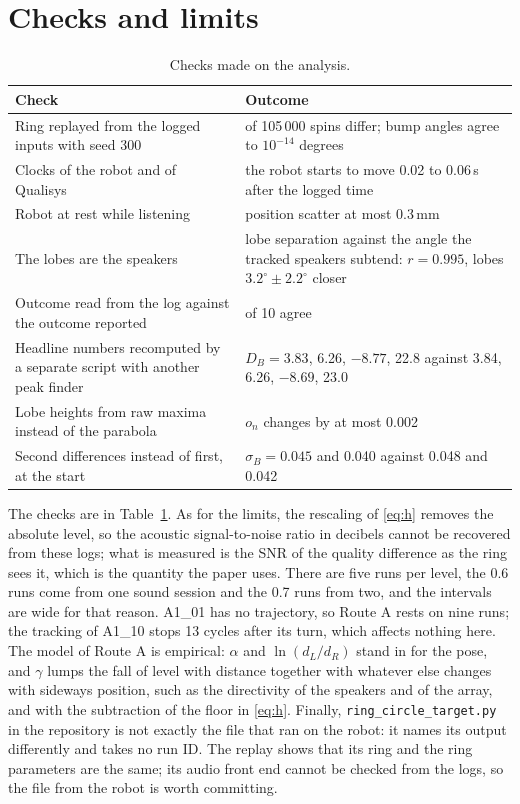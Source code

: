 \documentclass[11pt,a4paper]{article}
\newcommand{\code}[1]{\texttt{#1}}
\begin{document}
\section{Checks and limits}

\begin{table}[H]
\centering\small
\caption{Checks made on the analysis.}
\label{tab:checks}
\begin{tabular}{@{}>{\raggedright\arraybackslash}p{}>{\raggedright\arraybackslash}p{}@{}}
\toprule
Check & Outcome\\
\midrule
Ring replayed from the logged inputs with seed 300 & 0 of 105\,000 spins differ; bump angles agree to $10^{-14}$ degrees\\
Clocks of the robot and of Qualisys & the robot starts to move 0.02 to 0.06\,s after the logged time\\
Robot at rest while listening & position scatter at most 0.3\,mm\\
The lobes are the speakers & lobe separation against the angle the tracked speakers subtend: $r=0.995$, lobes $3.2^\circ\pm2.2^\circ$ closer\\
Outcome read from the log against the outcome reported & 10 of 10 agree\\
Headline numbers recomputed by a separate script with another peak finder & $D_B=3.83$, 6.26, $-8.77$, 22.8 against 3.84, 6.26, $-8.69$, 23.0\\
Lobe heights from raw maxima instead of the parabola & $o_n$ changes by at most 0.002\\
Second differences instead of first, at the start & $\sigma_B=0.045$ and 0.040 against 0.048 and 0.042\\
\bottomrule
\end{tabular}
\end{table}

The checks are in Table~\ref{tab:checks}. As for the limits, the rescaling of \eqref{eq:h} removes the
absolute level, so the acoustic signal-to-noise ratio in decibels cannot be recovered from these logs; what is
measured is the SNR of the quality difference as the ring sees it, which is the quantity the paper uses. There
are five runs per level, the 0.6 runs come from one sound session and the 0.7 runs from two, and the intervals
are wide for that reason. A1\_01 has no trajectory, so Route A rests on nine runs; the tracking of A1\_10 stops
13 cycles after its turn, which affects nothing here. The model of Route A is empirical: $\alpha$ and
$\ln(d_L/d_R)$ stand in for the pose, and $\gamma$ lumps the fall of level with distance together with whatever
else changes with sideways position, such as the directivity of the speakers and of the array, and with the subtraction of the floor in \eqref{eq:h}.
Finally,
\code{ring\_circle\_target.py} in the repository is not exactly the file that ran on the robot: it names its output
differently and takes no run ID. The replay shows that its ring and the ring parameters are the same; its audio
front end cannot be checked from the logs, so the file from the robot is worth committing.
\end{document}
